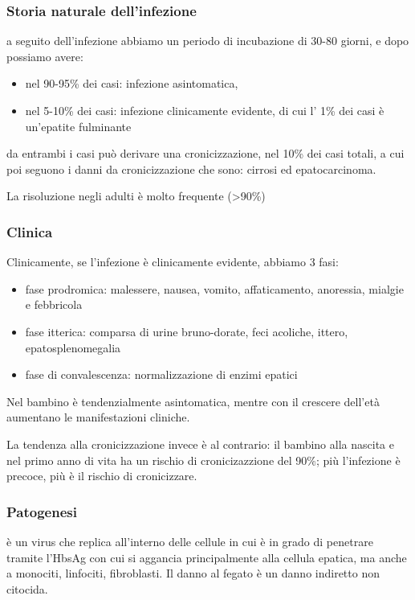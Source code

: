 \subsubsection{Storia naturale dell'infezione} a seguito dell'infezione abbiamo un periodo di
  incubazione di 30-80 giorni, e dopo possiamo avere:

\begin{itemize}
\item
  nel 90-95\% dei casi: infezione asintomatica,
\item
  nel 5-10\% dei casi: infezione clinicamente evidente, di cui l' 1\%
  dei casi è un'epatite fulminante
\end{itemize}
  da entrambi i casi può derivare una cronicizzazione, nel 10\% dei casi
  totali, a cui poi seguono i danni da cronicizzazione che sono: cirrosi
  ed epatocarcinoma.

  La risoluzione negli adulti è molto frequente (>90\%)

\subsubsection{Clinica} 
Clinicamente, se
  l'infezione è clinicamente evidente, abbiamo 3 fasi:

\begin{itemize}
\item
  fase prodromica: malessere, nausea, vomito, affaticamento, anoressia,
  mialgie e febbricola
\item
  fase itterica: comparsa di urine bruno-dorate, feci acoliche, ittero,
  epatosplenomegalia
\item
  fase di convalescenza: normalizzazione di enzimi epatici
\end{itemize}
  Nel bambino è tendenzialmente asintomatica, mentre con il crescere
  dell'età aumentano le manifestazioni cliniche.

  La tendenza alla cronicizzazione invece è al contrario: il bambino
  alla nascita e nel primo anno di vita ha un rischio di cronicizazzione
  del 90\%; più l'infezione è precoce, più è il rischio di cronicizzare.

\subsubsection{Patogenesi} 
è un virus che
  replica all'interno delle cellule in cui è in grado di penetrare
  tramite l'HbsAg con cui si aggancia principalmente alla cellula
  epatica, ma anche a monociti, linfociti, fibroblasti. Il danno al
  fegato è un danno indiretto non citocida.

